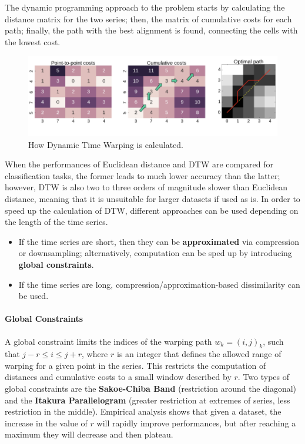 The dynamic programming approach to the problem starts by calculating the distance matrix for the two series; then, the matrix of cumulative costs for each path; finally, the path with the best alignment is found, connecting the cells with the lowest cost.
\begin{figure}[ht]
    \centering
    \includegraphics[width=1.0\linewidth]{img/dtw.png}
    \caption{How Dynamic Time Warping is calculated.}
    \label{fig:dtw}
\end{figure}

When the performances of Euclidean distance and DTW are compared for classification tasks, the former leads to much lower accuracy than the latter; however, DTW is also two to three orders of magnitude slower than Euclidean distance, meaning that it is unsuitable for larger datasets if used as is. In order to speed up the calculation of DTW, different approaches can be used depending on the length of the time series.

\begin{itemize}
    \item If the time series are short, then they can be \textbf{approximated} via compression or downsampling; alternatively, computation can be sped up by introducing \textbf{global constraints}.
    
    \item If the time series are long, compression/approximation-based dissimilarity can be used.
\end{itemize}

\paragraph{Global Constraints}

A global constraint limits the indices of the warping path $w_k = (i,j)_k$, such that $j-r \leq i \leq j+r$, where $r$ is an integer that defines the allowed range of warping for a given point in the series. This restricts the computation of distances and cumulative costs to a small window described by $r$. Two types of global constraints are the \textbf{Sakoe-Chiba Band} (restriction around the diagonal) and the \textbf{Itakura Parallelogram} (greater restriction at extremes of series, less restriction in the middle). Empirical analysis shows that given a dataset, the increase in the value of $r$ will rapidly improve performances, but after reaching a maximum they will decrease and then plateau.

